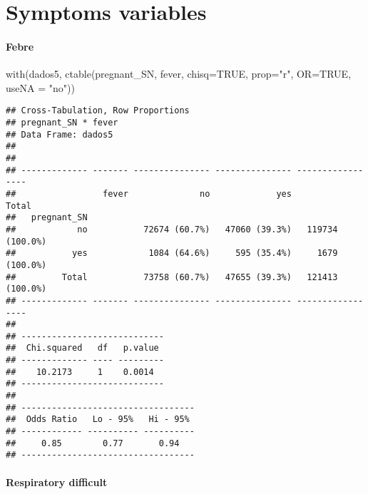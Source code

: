 \documentclass[
]{article}
\newenvironment{Shaded}{\begin{snugshade}}{\end{snugshade}}
\newcommand{\AttributeTok}[1]{\textcolor[rgb]{0.77,0.63,0.00}{#1}}
\newcommand{\ConstantTok}[1]{\textcolor[rgb]{0.00,0.00,0.00}{#1}}
\newcommand{\FunctionTok}[1]{\textcolor[rgb]{0.00,0.00,0.00}{#1}}
\newcommand{\NormalTok}[1]{#1}
\newcommand{\StringTok}[1]{\textcolor[rgb]{0.31,0.60,0.02}{#1}}
\begin{document}
\hypertarget{symptoms-variables}{%
\section{Symptoms variables}\label{symptoms-variables}}

\hypertarget{febre}{%
\paragraph{\texorpdfstring{{ Febre }}{ Febre }}\label{febre}}

\begin{Shaded}
\begin{Highlighting}[]
\FunctionTok{with}\NormalTok{(dados5, }\FunctionTok{ctable}\NormalTok{(pregnant\_SN, fever, }\AttributeTok{chisq=}\ConstantTok{TRUE}\NormalTok{, }\AttributeTok{prop=}\StringTok{"r"}\NormalTok{, }\AttributeTok{OR=}\ConstantTok{TRUE}\NormalTok{, }\AttributeTok{useNA =} \StringTok{"no"}\NormalTok{))}
\end{Highlighting}
\end{Shaded}

\begin{verbatim}
## Cross-Tabulation, Row Proportions  
## pregnant_SN * fever  
## Data Frame: dados5  
## 
## 
## ------------- ------- --------------- --------------- -----------------
##                 fever              no             yes             Total
##   pregnant_SN                                                          
##            no           72674 (60.7%)   47060 (39.3%)   119734 (100.0%)
##           yes            1084 (64.6%)     595 (35.4%)     1679 (100.0%)
##         Total           73758 (60.7%)   47655 (39.3%)   121413 (100.0%)
## ------------- ------- --------------- --------------- -----------------
## 
## ----------------------------
##  Chi.squared   df   p.value 
## ------------- ---- ---------
##    10.2173     1    0.0014  
## ----------------------------
## 
## ----------------------------------
##  Odds Ratio   Lo - 95%   Hi - 95% 
## ------------ ---------- ----------
##     0.85        0.77       0.94   
## ----------------------------------
\end{verbatim}

\hypertarget{respiratory-difficult}{%
\paragraph{\texorpdfstring{{ Respiratory difficult
}}{ Respiratory difficult }}\label{respiratory-difficult}}
\end{document}
